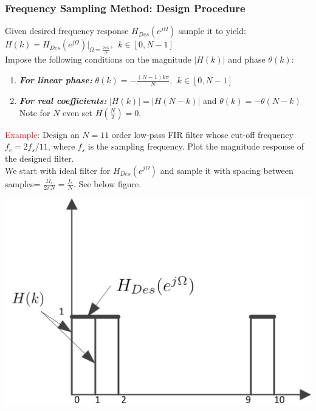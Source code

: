 \documentclass[mathserif, 10pt]{beamer} %
\begin{document}
\frame
{

\small
\frametitle{Frequency Sampling Method: Design Procedure}

Given desired frequency response $H_{Des}(e^{j\Omega})$ sample it to yield:\\ \vspace{.1in}
$H(k) = H_{Des}(e^{j\Omega})|_{\Omega = \frac{2\pi k}{N}},~~k\in[0,N-1]$\\ \vspace{.1in}
Impose the following conditions on the magnitude $|H(k)|$ and phase $\theta(k)$:\\ \vspace{.1in}
\begin{enumerate}
	\item \textit{\textbf{For linear phase:}}  $\theta(k) = -\frac{(N-1)k\pi}{N},~~k\in[0,N-1]$
	\item \textit{\textbf{For real coefficients:}}
	$|H(k)| = |H(N-k)|$ and $\theta(k) = -\theta(N-k)$ \\ \vspace{.1in}
Note for $N$ even set $H(\frac{N}{2})=0$.
\end{enumerate}

\textcolor{red}{Example:} Design an $N=11$ order low-pass FIR filter whose cut-off frequency $f_c=2f_s/11$,
where $f_s$ is the sampling frequency. Plot the magnitude response of the designed filter. \\ \vspace{.07in}
We start with ideal filter for $H_{Des}(e^{j\Omega})$ and sample it with spacing between samples= $\frac{\Omega_s}{2\pi N}=\frac{f_s}{N}$. See below figure. \\
\begin{center}
\includegraphics[width=.22\linewidth]{./Figures/Frequency-samplingex.png}
\end{center}


}
\end{document}
